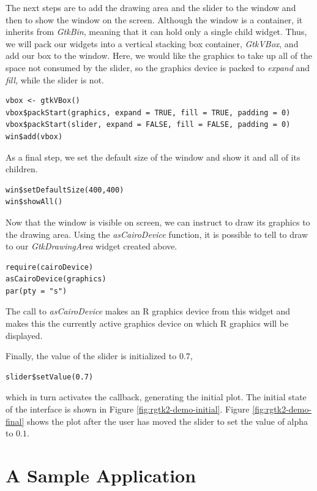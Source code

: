 \documentclass[article]{jss}
\begin{document}
The next steps are to add the drawing area and the slider to the
window and then to show the window on the screen. Although the window
is a
container, it inherits from \emph{GtkBin}, meaning that it can hold
only
a single child widget. Thus, we will pack our widgets into a vertical
stacking 
box container, \emph{GtkVBox}, and add our box to the window.
Here, we would like the graphics to take up all of the space not
consumed by the
slider, so the graphics device is packed to \emph{expand} and
\emph{fill}, while
the slider is not.
\begin{verbatim}
vbox <- gtkVBox()
vbox$packStart(graphics, expand = TRUE, fill = TRUE, padding = 0)
vbox$packStart(slider, expand = FALSE, fill = FALSE, padding = 0)
win$add(vbox)
\end{verbatim}

As a final step, we set the default size of the window and show it and
all of its children.
\begin{verbatim}
win$setDefaultSize(400,400)
win$showAll() 
\end{verbatim}

Now that the window is visible on screen, we can instruct 
to draw
its graphics to the drawing area. Using the \emph{asCairoDevice}
function, it is possible
to tell  to draw to our \emph{GtkDrawingArea} widget
created above.
\begin{verbatim}
require(cairoDevice)
asCairoDevice(graphics)
par(pty = "s")
\end{verbatim}
The call to \emph{asCairoDevice} makes an R graphics device from this
widget and makes this the currently active graphics device on which R
graphics will be displayed.

Finally, the value of the slider is initialized to $0.7$,
\begin{verbatim}
slider$setValue(0.7)
\end{verbatim}
which in turn activates the callback, generating the initial plot. The
initial state of the interface is shown in Figure
\ref{fig:rgtk2-demo-initial}.  Figure \ref{fig:rgtk2-demo-final} shows
the plot after the user has moved the slider to set the value of alpha
to $0.1$.


\section{A Sample Application}\label{sec:spreadsheet-example}
\end{document}
